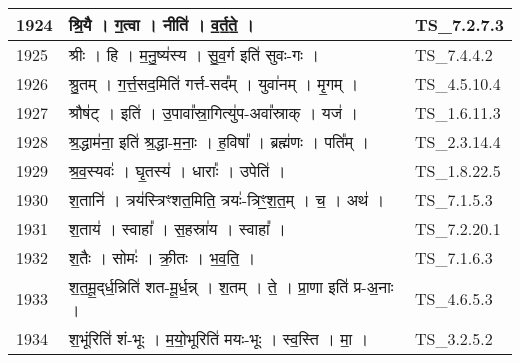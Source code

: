 \documentclass[17pt]{extarticle}
\begin{document}
\begin{longtable}{||p{0.4in}||p{4.9in}||p{0.9in}||}
    \hline
        
    1924 & श्रि॒यै   ।   ग॒त्वा   ।   नीति॑   ।   व॒र्त॒ते॒   ।    & TS\_7.2.7.3       \\
    
    \hline
        
    1925 & श्रीः   ।   हि   ।   म॒नु॒ष्य॑स्य   ।   सु॒व॒र्ग इति॑ सुवः{-}गः   ।    & TS\_7.4.4.2       \\
    
    \hline
        
    1926 & श्रु॒तम्   ।   ग॒र्त्त॒सद॒मिति॑ गर्त्त{-}सद᳚म्   ।   युवा॑नम्   ।   मृ॒गम्   ।    & TS\_4.5.10.4       \\
    
    \hline
        
    1927 & श्रौष॑ट्   ।   इति॑   ।   उ॒पावा᳚स्रा॒गित्यु॑प{-}अवा᳚स्राक्   ।   यज॑   ।    & TS\_1.6.11.3       \\
    
    \hline
        
    1928 & श्र॒द्धाम॑ना॒ इति॑ श्र॒द्धा{-}म॒नाः॒   ।   ह॒विषा᳚   ।   ब्रह्म॑णः   ।   पति᳚म्   ।    & TS\_2.3.14.4       \\
    
    \hline
        
    1929 & श्र॒व॒स्यवः॑   ।   घृ॒तस्य॑   ।   धाराः᳚   ।   उपेति॑   ।    & TS\_1.8.22.5       \\
    
    \hline
        
    1930 & श॒तानि॑   ।   त्रय॑स्त्रिꣳशत॒मिति॒ त्रयः॑{-}त्रिꣳ॒॒श॒त॒म्   ।   च॒   ।   अथ॑   ।    & TS\_7.1.5.3       \\
    
    \hline
        
    1931 & श॒ताय॑   ।   स्वाहा᳚   ।   स॒हस्रा॑य   ।   स्वाहा᳚   ।    & TS\_7.2.20.1       \\
    
    \hline
        
    1932 & श॒तैः   ।   सोमः॑   ।   क्री॒तः   ।   भ॒व॒ति॒   ।    & TS\_7.1.6.3       \\
    
    \hline
        
    1933 & श॒त॒मू॒द्‌र्ध॒न्निति॑ शत{-}मू॒र्ध॒न्न्   ।   श॒तम्   ।   ते॒   ।   प्रा॒णा इति॑ प्र{-}अ॒नाः   ।    & TS\_4.6.5.3       \\
    
    \hline
        
    1934 & श॒भूंरिति॑ शं{-}भूः   ।   म॒यो॒भूरिति॑ मयः{-}भूः   ।   स्व॒स्ति   ।   मा॒   ।    & TS\_3.2.5.2       \\
    

\end{longtable}
\end{document}

